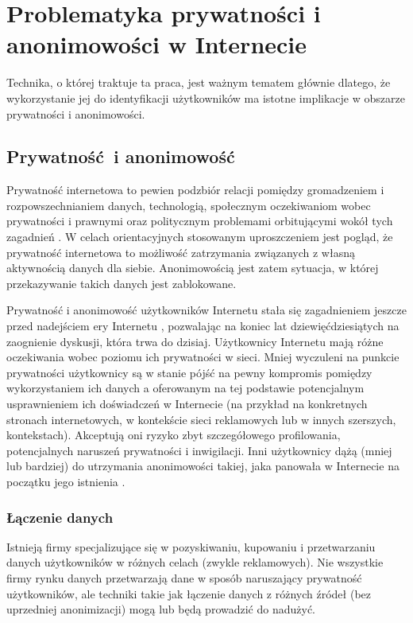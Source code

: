\chapter{Problematyka prywatności i anonimowości w Internecie}
Technika, o której traktuje ta praca, jest ważnym tematem głównie dlatego, że
wykorzystanie jej do identyfikacji użytkowników ma istotne implikacje w obszarze
prywatności i anonimowości.

\section{Prywatność i anonimowość}
Prywatność internetowa to pewien podzbiór relacji pomiędzy gromadzeniem i
rozpowszechnianiem danych, technologią, społecznym oczekiwaniom wobec
prywatności i prawnymi oraz politycznym problemami orbitującymi wokół tych
zagadnień \cite{michael2013uberveillance}. W celach orientacyjnych stosowanym
uproszczeniem jest pogląd, że prywatność internetowa to możliwość zatrzymania
związanych z własną aktywnością danych dla siebie. Anonimowością jest zatem
sytuacja, w której przekazywanie takich danych jest zablokowane.

Prywatność i anonimowość użytkowników Internetu stała się zagadnieniem jeszcze
przed nadejściem ery Internetu \cite{david1965some}, pozwalając na koniec lat
dziewięćdziesiątych na zaognienie dyskusji, która trwa do dzisiaj. Użytkownicy
Internetu mają różne oczekiwania wobec poziomu ich prywatności w sieci. Mniej
wyczuleni na punkcie prywatności użytkownicy są w stanie pójść na pewny
kompromis pomiędzy wykorzystaniem ich danych a oferowanym na tej podstawie
potencjalnym usprawnieniem ich doświadczeń w Internecie (na przykład na
konkretnych stronach internetowych, w kontekście sieci reklamowych lub w innych
szerszych, kontekstach). Akceptują oni ryzyko zbyt szczegółowego profilowania,
potencjalnych naruszeń prywatności i inwigilacji. Inni użytkownicy dążą (mniej
lub bardziej) do utrzymania anonimowości takiej, jaka panowała w Internecie na
początku jego istnienia \cite[s. 54--69]{snowden2019pamiec}.

\subsection{Łączenie danych}
Istnieją firmy specjalizujące się w pozyskiwaniu, kupowaniu i przetwarzaniu
danych użytkowników w różnych celach (zwykle reklamowych). Nie wszystkie firmy
rynku danych przetwarzają dane w sposób naruszający prywatność użytkowników, ale
techniki takie jak łączenie danych z różnych źródeł (bez uprzedniej
anonimizacji) mogą lub będą prowadzić do nadużyć.

